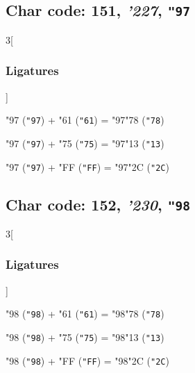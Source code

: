 \documentclass{article}
\newlength{\maxcharwidth}
\begin{document}
\subsection{Char code: 151, {\it'227}, {\tt"97}}
\label{char_151}


\begin{multicols}{3}[\subsubsection{Ligatures}]

{\testfont\char"97\noboundary} ({\tt"97}) + {\testfont\char"61\noboundary} ({\tt"61}) = {\testfont\char"97\noboundary}{\testfont\char"78\noboundary} ({\tt"78}) 

{\testfont\char"97\noboundary} ({\tt"97}) + {\testfont\char"75\noboundary} ({\tt"75}) = {\testfont\char"97\noboundary}{\testfont\char"13\noboundary} ({\tt"13}) 

{\testfont\char"97\noboundary} ({\tt"97}) + {\testfont\char"FF\noboundary} ({\tt"FF}) = {\testfont\char"97\noboundary}{\testfont\char"2C\noboundary} ({\tt"2C}) 

\end{multicols}

\subsection{Char code: 152, {\it'230}, {\tt"98}}
\label{char_152}


\begin{multicols}{3}[\subsubsection{Ligatures}]

{\testfont\char"98\noboundary} ({\tt"98}) + {\testfont\char"61\noboundary} ({\tt"61}) = {\testfont\char"98\noboundary}{\testfont\char"78\noboundary} ({\tt"78}) 

{\testfont\char"98\noboundary} ({\tt"98}) + {\testfont\char"75\noboundary} ({\tt"75}) = {\testfont\char"98\noboundary}{\testfont\char"13\noboundary} ({\tt"13}) 

{\testfont\char"98\noboundary} ({\tt"98}) + {\testfont\char"FF\noboundary} ({\tt"FF}) = {\testfont\char"98\noboundary}{\testfont\char"2C\noboundary} ({\tt"2C}) 

\end{multicols}
\end{document}
